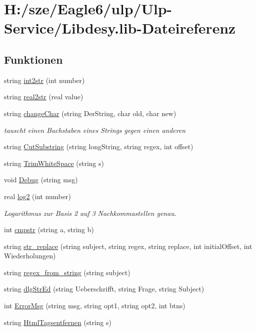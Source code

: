 \hypertarget{_libdesy_8lib}{}\section{H\+:/sze/\+Eagle6/ulp/\+Ulp-\/\+Service/\+Libdesy.lib-\/\+Dateireferenz}
\label{_libdesy_8lib}
\subsection*{Funktionen}
\begin{DoxyCompactItemize}
\item 
string \hyperlink{_libdesy_8lib_aabffd2ab08d259550d4750cfa9c249dc}{int2str} (int number)
\item 
string \hyperlink{_libdesy_8lib_add96f686d5ed9719cabc7c3134fea1de}{real2str} (real value)
\item 
string \hyperlink{_libdesy_8lib_a5355e56060fc9fff0501f961593df5eb}{change\+Char} (string Der\+String, char old, char new)
\begin{DoxyCompactList}\small\item\em tauscht einen Buchstaben eines Strings gegen einen anderen \end{DoxyCompactList}\item 
string \hyperlink{_libdesy_8lib_a2fd71140ea5241c20d59c939c655627e}{Cut\+Substring} (string long\+String, string regex, int offset)
\item 
string \hyperlink{_libdesy_8lib_a1c6d3c551ecc3ad23677a26a4fc28fda}{Trim\+White\+Space} (string s)
\item 
void \hyperlink{_libdesy_8lib_ac910cb5042d04372ec6085fe3b09fc4e}{Debug} (string msg)
\item 
real \hyperlink{_libdesy_8lib_a01fb81de9f4b6fee26e2b7aa2dd1cc01}{log2} (int number)
\begin{DoxyCompactList}\small\item\em Logarithmus zur Basis 2 auf 3 Nachkommastellen genau. \end{DoxyCompactList}\item 
int \hyperlink{_libdesy_8lib_a780b4b2a0e017f6e240cfc5f58330562}{cmpstr} (string a, string b)
\item 
string \hyperlink{_libdesy_8lib_a152e859e285dc572355bf99d375eeb61}{str\+\_\+replace} (string subject, string regex, string replace, int initial\+Offset, int Wiederholungen)
\item 
string \hyperlink{_libdesy_8lib_a42dc024c750a6c58d73533129846a7bf}{regex\+\_\+from\+\_\+string} (string subject)
\item 
string \hyperlink{_libdesy_8lib_a38171dda5d41cbb6969fe34d80feebe5}{dlg\+Str\+Ed} (string Ueberschrifft, string Frage, string Subject)
\item 
int \hyperlink{_libdesy_8lib_aab0957c74fc10e0befd90eaf07be7ffa}{Error\+Msg} (string msg, string opt1, string opt2, int btns)
\item 
string \hyperlink{_libdesy_8lib_ab460dc2212e571cb7fabadd679fa8bd3}{Html\+Tagsentfernen} (string s)
\end{DoxyCompactItemize}
